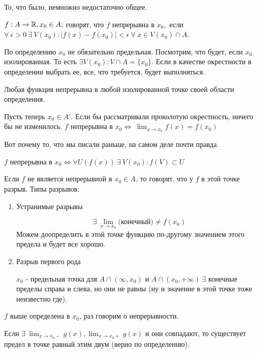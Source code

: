 \documentclass[12pt]{report}
\begin{document}
То, что было, немножно недостаточно общее.

\begin{defn}
$f: A \to \mathbb{R}, x_0 \in A;$ говорят, что $f$ непрерывна в $x_0,$ если $\forall ~\epsilon > 0 ~\exists ~V(x_0): |f(x) - f(x_0)| < \epsilon ~\forall ~x \in V(x_0) \cap A $.
\end{defn}

По определению $x_0$ не обязательно предельная. Посмотрим, что будет, если $x_0$ изолированная. То есть $\exists V(x_0): V \cap A = \{x_0\}$. Если в качестве окрестности в определении выбрать ее, все, что требуется, будет выполняться. 
\begin{cor}
Любая функция непрерывна в любой изолированной точке своей области определения.
\end{cor}

Пусть теперь $x_0 \in A'$. Если бы рассматривали проколотую окрестность, ничего бы не изменилось. $f$ непрерывна в $x_0 \Leftrightarrow ~\lim_{x \to x_0}{f(x)} = f(x_0)$

Вот почему то, что мы писали раньше, на самом деле почти правда.

\begin{defn}
$f$ непрерывна в $x_0 \Leftrightarrow \forall U(f(x)) ~\exists ~V(x_0): f(V) \subset U$
\end{defn}

\begin{defn}
Если $f$ не является непрерывной в $x_0 \in A$, то говорят, что у $f$ в этой точке разрыв. Типы разрывов:
\begin{enumerate}
\item Устранимые разрывы

$$\exists ~\lim_{x \to x_0} \mbox{(конечный)} \neq f(x_0)$$
Можем доопределить в этой точке функцию по-другому значением этого предела и будет все хорошо.

\item Разрыв первого рода

$x_0$ - предельная точка для $A \cap (\infty, x_0)$ и $A \cap (x_0, +\infty) ~\exists$ конечные пределы справа и слева, но они не равны (ну и значение в этой точке тоже неизвестно где).
\end{enumerate}
\end{defn}
\begin{note}
$f$ выше определена в $x_0$, раз говорим о непрерывности.
\end{note}

\begin{note}[2]
Если $\exists ~\lim_{x \to x_0 -}{g(x)}, \lim_{x \to x_0 +}{g(x)}$ и они совпадают, то существует предел в точке равный этим двум (верно по определению).
\end{note}
\end{document}
